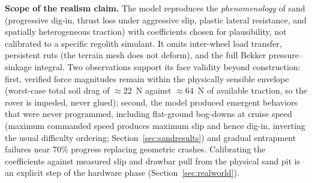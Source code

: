 \documentclass[conference]{IEEEtran}
\begin{document}
\vspace{1mm}
\noindent\textbf{Scope of the realism claim.} The model reproduces the \emph{phenomenology} of sand (progressive dig-in, thrust loss under aggressive slip, plastic lateral resistance, and spatially heterogeneous traction) with coefficients chosen for plausibility, not calibrated to a specific regolith simulant. It omits inter-wheel load transfer, persistent ruts (the terrain mesh does not deform), and the full Bekker pressure--sinkage integral. Two observations support its face validity beyond construction: first, verified force magnitudes remain within the physically sensible envelope (worst-case total soil drag of $\approx\!22$~N against $\approx\!64$~N of available traction, so the rover is impeded, never glued); second, the model produced emergent behaviors that were never programmed, including flat-ground bog-downs at cruise speed (maximum commanded speed produces maximum slip and hence dig-in, inverting the usual difficulty ordering; Section~\ref{sec:sandresults}) and gradual entrapment failures near $70\%$ progress replacing geometric crashes. Calibrating the coefficients against measured slip and drawbar pull from the physical sand pit is an explicit step of the hardware phase (Section~\ref{sec:realworld}).
\end{document}
